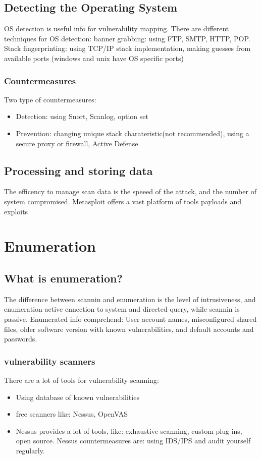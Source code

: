 \section{Detecting the Operating System}
OS detection is useful info for vulnerability mapping.
There are different techniques for OS detection: banner grabbing: using FTP, SMTP, HTTP, POP.
Stack fingerprinting: using TCP/IP stack implementation, making guesses from available ports (windows and unix have OS specific ports)


\subsection{Countermeasures}
Two type of countermeasures:
\begin{itemize}
    \item Detection: using Snort, Scanlog, option set
    \item Prevention: changing unique stack charateristic(not recommended), using a secure proxy or firewall, Active Defense.
\end{itemize}

\section{Processing and storing data}
The efficency to manage scan data is the speeed of the attack, and the number of system compromised.
Metasploit offers a vast platform of tools payloads and exploits

\chapter{Enumeration}
\section{What is enumeration?}
The difference between scannin and enumeration is the level of intrusiveness, and enumeration active cnnection to system and directed query, while scannin is passive.
Enumerated info comprehend: User account names, misconfigured shared files, older software version with known vulnerabilities, and default accounts and passwords. 

\subsection{vulnerability scanners}
There are a lot of tools for vulnerability scanning:
\begin{itemize}
    \item Using database of known vulnerabilities
    \item free scanners like: Nessus, OpenVAS
    \item Nessus provides a lot of tools, like: exhaustive scanning, custom plug ins, open source. Nessus countermeasures are: using IDS/IPS and audit yourself regularly.
\end{itemize}

